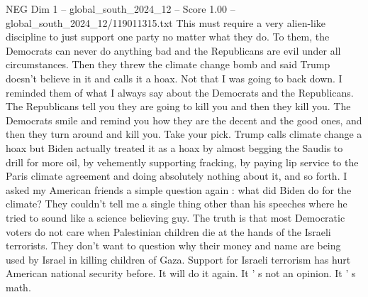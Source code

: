 \begin{textsample}{NEG Dim 1 – global\_south\_2024\_12 – Score 1.00 – global\_south\_2024\_12/119011315.txt}
This must require a very alien-like discipline to just support one party no matter what they do.
To them, the Democrats can never do anything bad and the Republicans are evil under all circumstances.
Then they threw the climate change bomb and said Trump doesn't believe in it and calls it a hoax.
Not that I was going to back down.
I reminded them of what I always say about the Democrats and the Republicans.
The Republicans tell you they are going to kill you and then they kill you.
The Democrats smile and remind you how they are the decent and the good ones, and then they turn around and kill you.
Take your pick.
Trump calls climate change a hoax but Biden actually treated it as a hoax by almost begging the Saudis to drill for more oil, by vehemently supporting fracking, by paying lip service to the Paris climate agreement and doing absolutely nothing about it, and so forth.
I asked my American friends a simple question again : what did Biden do for the climate?
They couldn't tell me a single thing other than his speeches where he tried to sound like a science believing guy.
The truth is that most Democratic voters do not care when Palestinian children die at the hands of the Israeli terrorists.
They don't want to question why their money and name are being used by Israel in killing children of Gaza.
Support for Israeli terrorism has hurt American national security before.
It will do it again.
It ' s not an opinion.
It ' s math.

\end{textsample}
